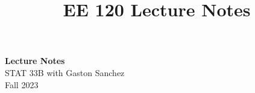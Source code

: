 \documentclass[11pt]{article}
\begin{document}
    \title{EE 120 Lecture Notes}
    
    \thispagestyle{empty}

    \begin{center}
    {\LARGE \bf Lecture Notes}\\
    {\large STAT 33B with Gaston Sanchez}\\
    Fall 2023
    \end{center}
    
    \tableofcontents

    
    
\end{document}

